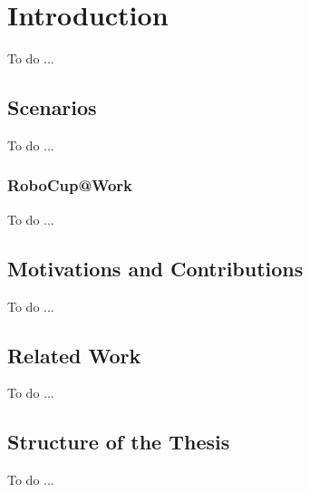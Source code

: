\chapter{Introduction}\label{ch:intro}
To do ...

\section{Scenarios}\label{sec:scenarios}
To do ...

\subsection{RoboCup@Work}\label{subsec:robocupatwork}
To do ...

\section{Motivations and Contributions}\label{sec:motivations}
To do ...

\section{Related Work}\label{sec:relatedwork}
To do ...

\section{Structure of the Thesis}\label{sec:thesisstructure}
To do ...